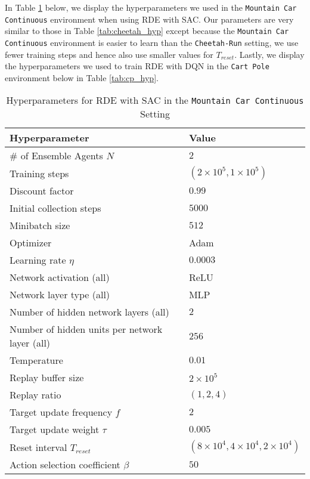 \documentclass[base]{subfiles}
\begin{document}
In Table \ref{tab:mc_hyp} below, we display the hyperparameters we used in the \texttt{Mountain Car Continuous} environment when using RDE with SAC. 
Our parameters are very similar to those in Table \ref{tab:cheetah_hyp} except because the \texttt{Mountain Car Continuous} environment is easier to learn than the \texttt{Cheetah-Run} setting, we use fewer training steps and hence also use smaller values for $T_{reset}$.
Lastly, we display the hyperparameters we used to train RDE with DQN in the \texttt{Cart Pole} environment below in Table \ref{tab:cp_hyp}.

\begin{table}[h]
    \caption{Hyperparameters for RDE with SAC in the \texttt{Mountain Car Continuous} Setting}
    \label{tab:mc_hyp}
    \centering
    \begin{tabular}{l|l}
        \toprule
         Hyperparameter & Value \\
         \hline
         \# of Ensemble Agents $N$ & $2$ \\
         Training steps & $(2 \times 10^5, 1 \times 10^5)$ \\
         Discount factor & $0.99$ \\
         Initial collection steps & $5000$ \\
         Minibatch size & $512$ \\
         Optimizer & Adam \\
         Learning rate $\eta$ & $0.0003$ \\
         Network activation (all) & ReLU \\
         Network layer type (all) & MLP \\
         Number of hidden network layers (all) & $2$ \\
         Number of hidden units per network layer (all) & $256$ \\
         Temperature & $0.01$ \\
         Replay buffer size & $2 \times 10^5$ \\
         Replay ratio & $(1,2,4)$ \\
         Target update frequency $f$ & $2$ \\
         Target update weight $\tau$ & $0.005$ \\
         Reset interval $T_{reset}$ & $(8 \times 10^4, 4 \times 10^4, 2 \times 10^4)$ \\
         Action selection coefficient $\beta$ & $50$ \\
         \bottomrule
    \end{tabular}
\end{table}
\end{document}

